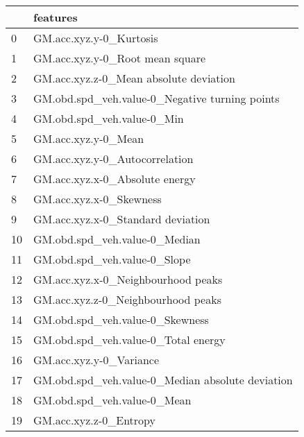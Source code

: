 \begin{tabular}{ll}
\toprule
{} &                                          features \\
\midrule
0  &                           GM.acc.xyz.y-0\_Kurtosis \\
1  &                   GM.acc.xyz.y-0\_Root mean square \\
2  &            GM.acc.xyz.z-0\_Mean absolute deviation \\
3  &    GM.obd.spd\_veh.value-0\_Negative turning points \\
4  &                        GM.obd.spd\_veh.value-0\_Min \\
5  &                               GM.acc.xyz.y-0\_Mean \\
6  &                    GM.acc.xyz.y-0\_Autocorrelation \\
7  &                    GM.acc.xyz.x-0\_Absolute energy \\
8  &                           GM.acc.xyz.x-0\_Skewness \\
9  &                 GM.acc.xyz.x-0\_Standard deviation \\
10 &                     GM.obd.spd\_veh.value-0\_Median \\
11 &                      GM.obd.spd\_veh.value-0\_Slope \\
12 &                GM.acc.xyz.x-0\_Neighbourhood peaks \\
13 &                GM.acc.xyz.z-0\_Neighbourhood peaks \\
14 &                   GM.obd.spd\_veh.value-0\_Skewness \\
15 &               GM.obd.spd\_veh.value-0\_Total energy \\
16 &                           GM.acc.xyz.y-0\_Variance \\
17 &  GM.obd.spd\_veh.value-0\_Median absolute deviation \\
18 &                       GM.obd.spd\_veh.value-0\_Mean \\
19 &                            GM.acc.xyz.z-0\_Entropy \\
\bottomrule
\end{tabular}
